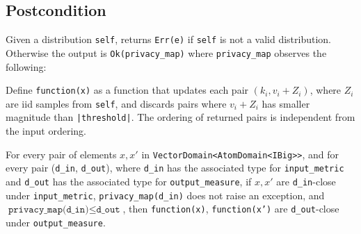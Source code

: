 \documentclass{article}
\begin{document}
\subsection*{Postcondition}
\begin{theorem}
    Given a distribution \texttt{self},
    returns \texttt{Err(e)} if \texttt{self} is not a valid distribution.
    Otherwise the output is \texttt{Ok(privacy\_map)}
    where \texttt{privacy\_map} observes the following:

    Define \texttt{function(x)} as a function that updates each pair $(k_i, v_i + Z_i)$,
    where $Z_i$ are iid samples from \texttt{self},
    and discards pairs where $v_i + Z_i$ has smaller magnitude than \texttt{|threshold|}.
    The ordering of returned pairs is independent from the input ordering.

    For every pair of elements $x, x'$ in \texttt{VectorDomain<AtomDomain<IBig>{}>},
    and for every pair (\texttt{d\_in}, \texttt{d\_out}),
    where \texttt{d\_in} has the associated type for \texttt{input\_metric} and \texttt{d\_out} has the associated type for \texttt{output\_measure},
    if $x, x'$ are \texttt{d\_in}-close under \texttt{input\_metric}, \texttt{privacy\_map(d\_in)} does not raise an exception,
    and $\texttt{privacy\_map(d\_in)} \leq \texttt{d\_out}$,
    then \texttt{function(x)}, \texttt{function(x')} are \texttt{d\_out}-close under \texttt{output\_measure}.
\end{theorem}
\end{document}
